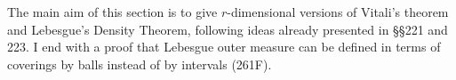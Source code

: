       
\def\dist{\mathop{\text{dist}}} 
      
\def\chaptername{Change of variable in the integral} 
\def\sectionname{Vitali's theorem in $\BbbR^r$} 
      
      
\def\headlinesectionname{Vitali's theorem in $\eightBbb R^r$} 
      
The main aim of this section is to give $r$-dimensional versions of 
Vitali's theorem and Lebesgue's Density Theorem, following 
ideas already presented in \S\S221 and 223.   I end with a proof that
Lebesgue outer measure can be defined in terms of coverings by balls
instead of by intervals (261F).
      
